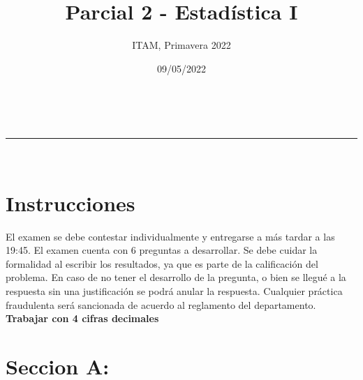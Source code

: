 \documentclass[addpoints]{exam}
\makeatletter
\newcommand{\linia}{\rule{\linewidth}{0.5pt}}
\theoremstyle{mytheor}
\renewcommand{\maketitle}{
    \begin{center}
    \vspace{2ex}
    {\huge \textsc{\@title}}
    \vspace{1ex}
    \\
    \linia\\
    \@author \hfill \@date
    \vspace{4ex}
    \end{center}
  }
\makeatother
\begin{document}
  
  \title{Parcial 2 - Estadística I}
  
  \author{ITAM, Primavera 2022}
  
  \date{09/05/2022}
  
  \maketitle
  
  \section*{Instrucciones}
  El examen se debe contestar individualmente y entregarse a más tardar a las 19:45. El examen cuenta con 6 preguntas a desarrollar. Se debe cuidar la formalidad al escribir los resultados, ya que es parte de la calificación del problema. En caso de no tener el desarrollo de la pregunta, o bien se llegué a la respuesta sin una justificación se podrá anular la respuesta. Cualquier práctica fraudulenta será sancionada de acuerdo al reglamento del departamento. \textbf{Trabajar con 4 cifras decimales}
  
\vspace{10pt}

  \section*{Seccion A: }
  
\end{document}
